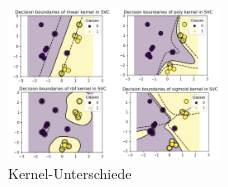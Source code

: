 \begin{figure}[!h]    
    \centering
    \includegraphics[width=0.5\textwidth]{supervisedLearning/kernel-svm-example.png}
    \caption{Kernel-Unterschiede}
    \label{fig:kernelOverview}
\end{figure}